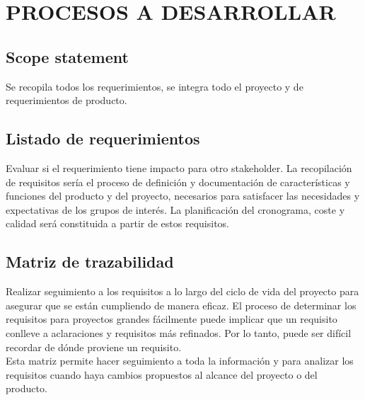 \chapter{PROCESOS A DESARROLLAR}

\section{Scope statement}
Se recopila todos los requerimientos, se integra todo el proyecto y de requerimientos de producto.
%
\section{Listado de requerimientos}
Evaluar si el requerimiento tiene impacto para otro stakeholder. La recopilaci\'on de requisitos ser\'ia el proceso
de definici\'on y documentaci\'on de caracter\'isticas y funciones del producto y del proyecto, necesarios para 
satisfacer las necesidades y expectativas de los grupos de inter\'es. La planificaci\'on del cronograma, coste y
calidad ser\'a constituida a partir de estos requisitos.
%
\section{Matriz de trazabilidad}
Realizar seguimiento a los requisitos a lo largo del ciclo de vida del proyecto para asegurar que se est\'an
cumpliendo de manera eficaz. El proceso de determinar los requisitos para proyectos grandes f\'acilmente puede
implicar que un requisito conlleve a aclaraciones y requisitos m\'as refinados. Por lo tanto, puede ser dif\'icil
recordar de d\'onde proviene un requisito.\\%
Esta matriz permite hacer seguimiento a toda la informaci\'on y para analizar los requisitos cuando haya cambios
propuestos al alcance del proyecto o del producto.
%